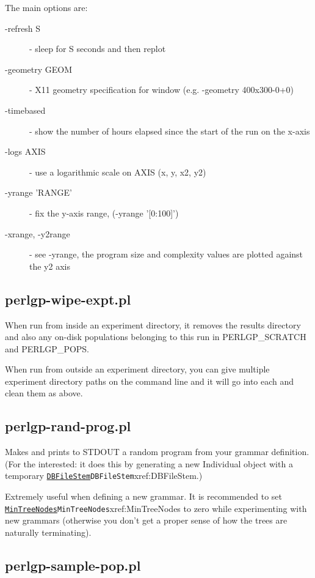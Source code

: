 \documentclass[a4paper]{article}
\begin{document}
The main options are:
\begin{description}
\item[-refresh S] - sleep for S seconds and then replot
\item[-geometry GEOM] - X11 geometry specification for window (e.g. -geometry 400x300-0+0)
\item[-timebased] - show the number of hours elapsed since the start of the run on the x-axis
\item[-logs AXIS] - use a logarithmic scale on AXIS (x, y, x2, y2)
\item[-yrange 'RANGE'] - fix the y-axis range, (-yrange '[0:100]')
\item[-xrange, -y2range] - see -yrange, the program size and complexity values are plotted against the y2 axis
\end{description}

\subsection{perlgp-wipe-expt.pl}

When run from inside an experiment directory, it removes the results
directory and also any on-disk populations belonging to this run in
PERLGP\_SCRATCH and PERLGP\_POPS.

When run from outside an experiment directory, you can give multiple
experiment directory paths on the command line and it will go into
each and clean them as above.

\subsection{perlgp-rand-prog.pl}

Makes and prints to STDOUT a random program from your grammar
definition.  (For the interested: it does this by generating a new
Individual object with a temporary \hyperref[no]{\texttt{DBFileStem}}{\texttt{DBFileStem}}{xref:DBFileStem}.)

Extremely useful when defining a new grammar.  It is recommended to
set \hyperref[no]{\texttt{MinTreeNodes}}{\texttt{MinTreeNodes}}{xref:MinTreeNodes} to zero while experimenting with new
grammars (otherwise you don't get a proper sense of how the trees are
naturally terminating).

\subsection{perlgp-sample-pop.pl}
\end{document}
